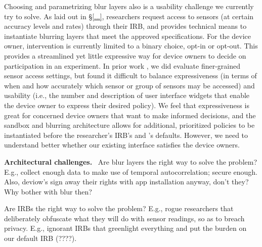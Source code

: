 Choosing and parametrizing blur layers also is a usability 
challenge we currently try to solve. As laid out in \S\ref{...}, 
researchers request access to sensors (at certain accuracy levels 
and rates) through their IRB, and \sysname provides technical means 
to instantiate blurring layers that meet the approved specifications. 
For the device owner, intervention is currently limited to a binary 
choice, opt-in or opt-out. This provides a streamlined yet little 
expressive way for device owners to decide on participation in an 
experiment. In prior work \cite{sensorium}, we did evaluate 
finer-grained sensor access settings, but found it difficult to 
balance expressiveness (in terms of when and how accurately which 
sensor or group of sensors may be accessed) and usability (i.e., 
the number and description of user interface widgets that enable 
the device owner to express their desired policy).
We feel that expressiveness is great for concerned device owners 
that want to make informed decisions, and the sandbox and blurring 
architecture allows for additional, prioritized policies to be 
instantiated before the researcher's IRB's and \sysname's defaults. 
However, we need to understand better whether our existing interface 
satisfies the device owners.


\textbf{Architectural challenges.}~
Are blur layers the right way to solve the problem? E.g., 
collect enough data to make use of temporal autocorrelation; secure enough.
Also, deviow's sign away their rights with app installation anyway, 
don't they? Why bother with blur then?

Are IRBs the right way to solve the problem? E.g., 
rogue researchers that deliberately obfuscate what they will 
do with sensor readings, so as to breach privacy. E.g., 
ignorant IRBs that greenlight everything and put the burden on 
our default IRB (????).

